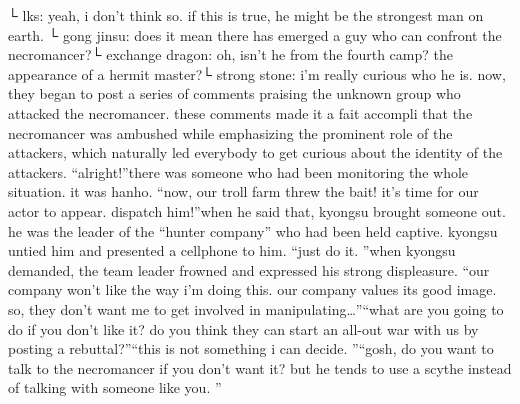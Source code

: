 └ lks: yeah, i don’t think so.
 if this is true, he might be the strongest man on earth.
└ gong jinsu: does it mean there has emerged a guy who can confront the necromancer?└ exchange dragon: oh, isn’t he from the fourth camp? the appearance of a hermit master?└ strong stone: i’m really curious who he is.
now, they began to post a series of comments praising the unknown group who attacked the necromancer.
 these comments made it a fait accompli that the necromancer was ambushed while emphasizing the prominent role of the attackers, which naturally led everybody to get curious about the identity of the attackers.
“alright!”there was someone who had been monitoring the whole situation.
 it was hanho.
“now, our troll farm threw the bait! it’s time for our actor to appear.
 dispatch him!”when he said that, kyongsu brought someone out.
 he was the leader of the “hunter company” who had been held captive.
kyongsu untied him and presented a cellphone to him.
“just do it.
”when kyongsu demanded, the team leader frowned and expressed his strong displeasure.
“our company won’t like the way i’m doing this.
 our company values its good image.
 so, they don’t want me to get involved in manipulating…”“what are you going to do if you don’t like it? do you think they can start an all-out war with us by posting a rebuttal?”“this is not something i can decide.
”“gosh, do you want to talk to the necromancer if you don’t want it? but he tends to use a scythe instead of talking with someone like you.
”

 
